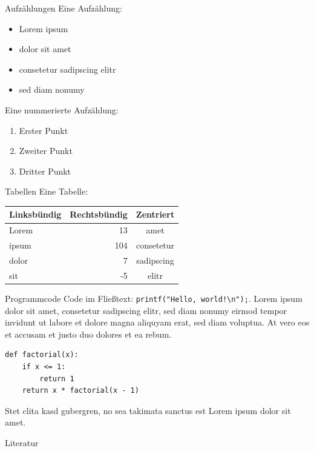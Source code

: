 \documentclass[a4paper, 10pt, twocolumn]{scrartcl}
\begin{document}
\begin{block}{Aufzählungen}
Eine Aufzählung:

\begin{itemize}
\item Lorem ipsum
\item dolor sit amet
\item consetetur sadipscing elitr
\item sed diam nonumy
\end{itemize}

Eine nummerierte Aufzählung:

\begin{enumerate}
\item Erster Punkt
\item Zweiter Punkt
\item Dritter Punkt
\end{enumerate}
\end{block}


\begin{block}{Tabellen}
Eine Tabelle:

\begin{center}
\begin{tabular}{lrc}
\toprule
Linksbündig & Rechtsbündig & Zentriert \\
\midrule
Lorem &  13 & amet \\
ipsum & 104 & consetetur \\
dolor &   7 & sadipscing \\
sit   &  -5 & elitr \\
\bottomrule
\end{tabular}
\label{beispieltabelle}
\end{center}
\end{block}


\begin{block}{Programmcode}
Code im Fließtext: \lstinline{printf("Hello, world!\n");}. Lorem ipsum dolor sit amet, consetetur sadipscing elitr, sed diam nonumy eirmod tempor invidunt ut labore et dolore magna aliquyam erat, sed diam voluptua. At vero eos et accusam et justo duo dolores et ea rebum.

\begin{lstlisting}
def factorial(x):
    if x <= 1:
        return 1
    return x * factorial(x - 1)
\end{lstlisting}

Stet clita kasd gubergren, no sea takimata sanctus est Lorem ipsum dolor sit amet.
\end{block}

\nocite{*} %
\begin{block}{Literatur}
\printbibliography[heading=none]
\end{block}
\end{document}

